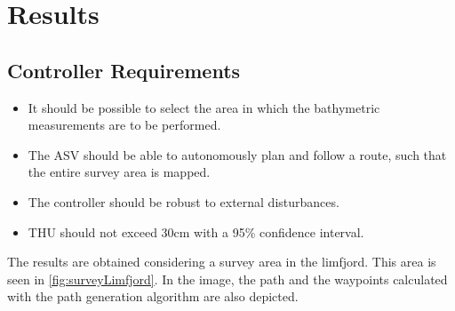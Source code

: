 \chapter{Results}\label{chap:results}

\section{Controller Requirements}
\begin{itemize}
    \item It should be possible to select the area in which the bathymetric measurements are to be performed.
    \item The ASV should be able to autonomously plan and follow a route, such that the entire survey area is mapped.
    \item The controller should be robust to external disturbances.
    \item THU should not exceed 30cm with a 95\% confidence interval.
\end{itemize}

The results are obtained considering a survey area in the limfjord. This area is seen in \autoref{fig:surveyLimfjord}. In the image, the path and the waypoints calculated with the path generation algorithm are also depicted.


